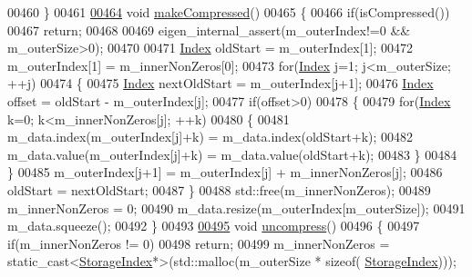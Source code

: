 \begin{DoxyCode}
00460     \}
00461 
\hyperlink{group___sparse_core___module_a5ff54ffc10296f9466dc81fa888733fd}{00464}     \textcolor{keywordtype}{void} \hyperlink{group___sparse_core___module_a5ff54ffc10296f9466dc81fa888733fd}{makeCompressed}()
00465     \{
00466       \textcolor{keywordflow}{if}(isCompressed())
00467         \textcolor{keywordflow}{return};
00468       
00469       eigen\_internal\_assert(m\_outerIndex!=0 && m\_outerSize>0);
00470       
00471       \hyperlink{group___core___module_a554f30542cc2316add4b1ea0a492ff02}{Index} oldStart = m\_outerIndex[1];
00472       m\_outerIndex[1] = m\_innerNonZeros[0];
00473       \textcolor{keywordflow}{for}(\hyperlink{group___core___module_a554f30542cc2316add4b1ea0a492ff02}{Index} j=1; j<m\_outerSize; ++j)
00474       \{
00475         \hyperlink{group___core___module_a554f30542cc2316add4b1ea0a492ff02}{Index} nextOldStart = m\_outerIndex[j+1];
00476         \hyperlink{group___core___module_a554f30542cc2316add4b1ea0a492ff02}{Index} offset = oldStart - m\_outerIndex[j];
00477         \textcolor{keywordflow}{if}(offset>0)
00478         \{
00479           \textcolor{keywordflow}{for}(\hyperlink{group___core___module_a554f30542cc2316add4b1ea0a492ff02}{Index} k=0; k<m\_innerNonZeros[j]; ++k)
00480           \{
00481             m\_data.index(m\_outerIndex[j]+k) = m\_data.index(oldStart+k);
00482             m\_data.value(m\_outerIndex[j]+k) = m\_data.value(oldStart+k);
00483           \}
00484         \}
00485         m\_outerIndex[j+1] = m\_outerIndex[j] + m\_innerNonZeros[j];
00486         oldStart = nextOldStart;
00487       \}
00488       std::free(m\_innerNonZeros);
00489       m\_innerNonZeros = 0;
00490       m\_data.resize(m\_outerIndex[m\_outerSize]);
00491       m\_data.squeeze();
00492     \}
00493 
\hyperlink{group___sparse_core___module_a7e560ebda035e992d2c99875cc7c3af3}{00495}     \textcolor{keywordtype}{void} \hyperlink{group___sparse_core___module_a7e560ebda035e992d2c99875cc7c3af3}{uncompress}()
00496     \{
00497       \textcolor{keywordflow}{if}(m\_innerNonZeros != 0)
00498         \textcolor{keywordflow}{return}; 
00499       m\_innerNonZeros = \textcolor{keyword}{static\_cast<}\hyperlink{group___sparse_core___module_a0b540ba724726ebe953f8c0df06081ed}{StorageIndex}*\textcolor{keyword}{>}(std::malloc(m\_outerSize * \textcolor{keyword}{sizeof}(
      \hyperlink{group___sparse_core___module_a0b540ba724726ebe953f8c0df06081ed}{StorageIndex})));

\end{DoxyCode}
